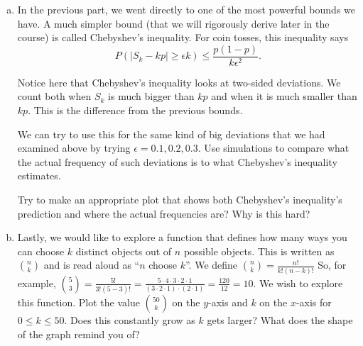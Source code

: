 \documentclass[]{article}
\newif\ifsolutions
\renewcommand{\answer}[1]{{\color{mydarkblue}\textbf{Solution:}#1}}
\begin{document}
\begin{qunlist}
\begin{enumerate}[a)]

\qpart
\item In the previous part, we went directly to one of the most
  powerful bounds we have. A much simpler bound (that we will
  rigorously derive later in the course) is called Chebyshev's
  inequality. For coin tosses, this inequality says 
$$P(|S_k - k p| \geq \epsilon k) \leq \frac{ p (1-p)}{k \epsilon^2}.$$ 

Notice here that Chebyshev's inequality looks at two-sided
deviations. We count both when $S_k$ is much bigger than $kp$ and when
it is much smaller than $kp$. This is the difference from the previous
bounds. 

We can try to use this for the same kind of big deviations that we had
examined above by trying $\epsilon = 0.1, 0.2, 0.3$. Use simulations to
compare what the actual frequency of such deviations is to what
Chebyshev's inequality estimates.  

Try to make an appropriate plot that shows both Chebyshev's
inequality's prediction and where the actual frequencies are? Why is
this hard?

\qpart
\item Lastly, we would like to explore a function that defines how many ways you can choose $k$ distinct objects out of $n$ possible objects. This is written as $\binom{n} {k}$ and is read aloud as ``$n$ choose $k$''. We define $\binom{n}{k} = \frac{n!}{k!(n-k)!}$ So, for example, $\binom{5}{3} = \frac{5!}{3!(5-3)!} = \frac{5\cdot 4 \cdot 3 \cdot 2 \cdot 1}{(3 \cdot 2 \cdot 1) \cdot (2 \cdot 1)} = \frac{120}{12} = 10$. We wish to explore this function. Plot the value $\binom{50}{k}$ on the $y$-axis and $k$ on the $x$-axis for $0 \leq k \leq 50$.
Does this constantly grow as $k$ gets larger? What does the shape of the graph remind you of?


\end{enumerate}
\end{qunlist}
\end{document}
